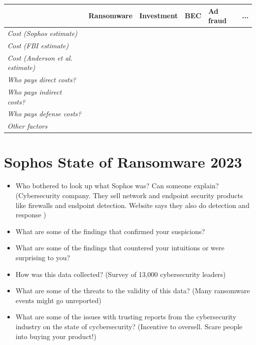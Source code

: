 \documentclass[11pt]{article}
\begin{document}
\begin{table}[]
    \begin{tabular}{|l|l|l|l|l|l|}
    \hline
                                             & \textbf{Ransomware} & \textbf{Investment} & \textbf{BEC} & \textbf{Ad fraud} & \textbf{...} \\ \hline
    \textit{Cost (Sophos estimate)}          &                     &                     &              &                   &              \\ \hline
    \textit{Cost (FBI estimate)}             &                     &                     &              &                   &              \\ \hline
    \textit{Cost (Anderson et al. estimate)} &                     &                     &              &                   &              \\ \hline
    \textit{Who pays direct costs?}          &                     &                     &              &                   &              \\ \hline
    \textit{Who pays indirect costs?}        &                     &                     &              &                   &              \\ \hline
    \textit{Who pays defense costs?}         &                     &                     &              &                   &              \\ \hline
    \textit{Other factors}                   &                     &                     &              &                   &              \\ \hline
    \end{tabular}
\end{table}





\section*{Sophos State of Ransomware 2023}

\begin{itemize}
    \item Who bothered to look up what Sophos was? Can someone explain? (Cybersecurity company. They sell network and endpoint security products like firewalls and endpoint detection. Website says they also do detection and response )
    \item What are some of the findings that confirmed your suspicions?
    \item What are some of the findings that countered your intuitions or were surprising to you? 
    \item How was this data collected? (Survey of 13,000 cybersecurity leaders)
    \item What are some of the threats to the validity of this data? (Many ransomware events might go unreported)
    \item What are some of the issues with trusting reports from the cybersecurity industry on the state of cycbersecurity? (Incentive to oversell. Scare people into buying your product!)
\end{itemize}
\end{document}
